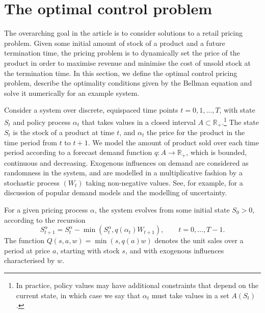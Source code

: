 \documentclass[main.tex]{subfiles}
\begin{document}
\listoftodos

\section{The optimal control problem}\label{sec:bellman_optimal_control}
The overarching goal in the article is to consider solutions to a retail
pricing problem.
Given some initial amount of stock of a product and a future
termination time,
the pricing problem is to
dynamically set the price
of the product in order to maximise revenue and minimise the cost of
unsold stock at the termination time.
In this section, we define the optimal control pricing problem,
describe the optimality conditions given by the Bellman equation and
solve it numerically for an example system.

Consider a system over discrete, equispaced time points
$t=0,1,\dots,T$, with state
$S_t$ and policy process $\alpha_t$ that takes values in a closed
interval $A\subset\mathbb R_+$.\footnote{
  In practice, policy values may have additional constraints that depend
  on the current state,
  in which case we say that $\alpha_t$ must take values
  in a set $A(S_t)$.
}
The state $S_t$ is the stock of a product at time $t$, and
$\alpha_t$ the price for the product in the time period from $t$ to
$t+1$. We model the amount of product sold over each time period according
to a forecast demand
function $q:A\to\mathbb R_+$, which is bounded, continuous and decreasing.
Exogenous influences on demand are considered as randomness in the
system, and are
modelled in a multiplicative fashion by a stochastic process
$(W_t)$ taking non-negative values. See, for example,
\citet[Ch.~7]{talluri2006theory} for a discussion of
popular demand models and the modelling of uncertainty.

For a given pricing process $\alpha$, the
system evolves from some initial state $S_0>0$, according to the
recursion
\begin{equation}\label{eq:stock_dynamics}
  S_{t+1}^\alpha=S_t^\alpha-\min(S_t^\alpha,q(\alpha_t)W_{t+1}),\qquad t=0,\dots,T-1.
\end{equation}
The function $Q(s,a,w)=\min(s,q(a)w)$ denotes the unit sales over a
period at price $a$,
starting with stock $s$, and with exogenous influences
characterised by $w$.
\end{document}
